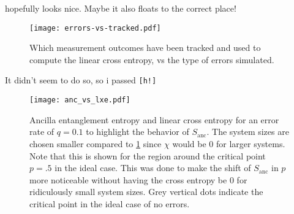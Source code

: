  hopefully looks nice. Maybe it also floats to the correct
place!
\begin{figure}[h!]
  \centering
  \texttt{[image: errors-vs-tracked.pdf]}
  \caption{Which measurement outcomes have been tracked and used to compute the
  linear cross entropy, vs the type of errors simulated.}
  \label{fig:err-vs-tra}
\end{figure}
It didn't seem to do so, so i passed \texttt{[h!]}

\begin{figure}[h]
  \centering
  \texttt{[image: anc\_vs\_lxe.pdf]}
  \caption{Ancilla entanglement entropy and linear cross entropy for an error
  rate of $q=0.1$ to highlight the behavior of $S_\mathrm{anc}$. The system sizes are chosen smaller compared to
\cref{fig:err-vs-tra} since $\chi$ would be $0$ for larger systems. Note that
this is shown for the region around the critical point $p=.5$ in the ideal
case. This was done to make the shift of $S_\mathrm{anc}$ in $p$ more
noticeable without having the cross entropy be $0$ for ridiculously small
system sizes. Grey vertical dots indicate the critical point in the ideal case
of no errors.}
  \label{fig:large-q-anc-vs-lxe}
\end{figure}
